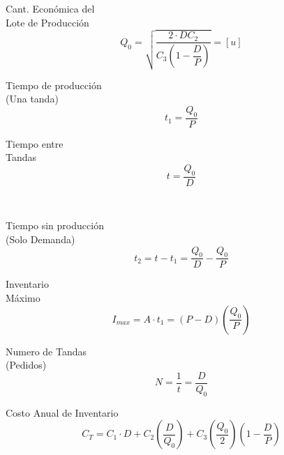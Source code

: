 \documentclass[10pt,letterpaper]{article}
\begin{document}
\begin{enumerate}
\noindent
\begin{minipage}[t]{.33\textwidth}
\raggedright
\item Cant. Económica del \\ Lote de Producción
$$
Q_0 = \sqrt{\dfrac{2\cdot D C_2}{C_3 \left( 1-\dfrac{D}{P} \right)}} =[u]
$$
\end{minipage}%
\begin{minipage}[t]{.33\textwidth}
\raggedright
\item Tiempo de producción \\ (Una tanda)
$$
t_1 = \dfrac{Q_0}{P}
$$
\end{minipage}%
\begin{minipage}[t]{.33\textwidth}
\raggedright
\item Tiempo entre \\ Tandas \\
$$
t=\dfrac{Q_0}{D}
$$
\end{minipage}
\\${ }$\\
\noindent
\begin{minipage}[t]{.33\textwidth}
\raggedright
\item Tiempo sin producción \\ (Solo Demanda)
$$
t_2 = t-t_1 = \dfrac{Q_0}{D}-\dfrac{Q_0}{P}
$$
\end{minipage}%
\begin{minipage}[t]{.33\textwidth}
\raggedright
\item Inventario \\Máximo
$$
I_{max}=A\cdot t_1 = (P-D)\left(\dfrac{Q_0}{P} \right)
$$
\end{minipage}%
\begin{minipage}[t]{.33\textwidth}
\raggedright
\item Numero de Tandas \\ (Pedidos)
$$
N=\dfrac{1}{t} = \dfrac{D}{Q_0}
$$
\end{minipage}
\item Costo Anual de Inventario
$$
C_T = C_1\cdot D + C_2 \left( \dfrac{D}{Q_0} \right) + C_3 \left(\dfrac{Q_0}{2} \right)  \left( 1- \dfrac{D}{P} \right)
$$
\end{enumerate}
\end{document}
